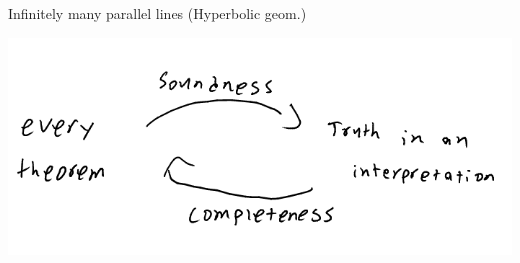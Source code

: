 \documentclass[11pt]{article}
\begin{document}
\begin{enumerate}
Infinitely many parallel lines
(Hyperbolic geom.)

\begin{center}
\includegraphics[width=.9\linewidth]{./Images/i8.png}
\end{center}
\end{enumerate}
\end{document}
